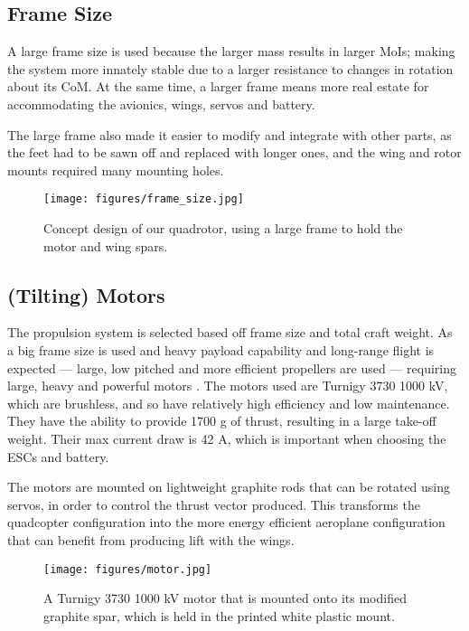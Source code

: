 \subsection*{Frame Size} 
A large frame size is used because the larger mass results in larger \acp{MoI}; making the system more innately stable due to a larger resistance to changes in rotation about its \ac{CoM}. At the same time, a larger frame means more real estate for accommodating the avionics, wings, servos and battery.

The large frame also made it easier to modify and integrate with other parts, as the feet had to be sawn off and replaced with longer ones, and the wing and rotor mounts required many mounting holes.

\begin{figure}[htpb!]
    \centering
    \texttt{[image: figures/frame\_size.jpg]}
    \caption{Concept design of our quadrotor, using a large frame to hold the motor and wing spars.}
    \label{fig:frame_size}
\end{figure}



\subsection*{(Tilting) Motors}
The propulsion system is selected based off frame size and total craft weight. As a big frame size is used and heavy payload capability and long-range flight is expected --- large, low pitched and more efficient propellers are used --- requiring large, heavy and powerful motors \cite{bershadsky+2016choosing_propulsion}. The motors used are Turnigy 3730 1000 \si{\kilo\volt}, which are brushless, and so have relatively high efficiency and low maintenance. They have the ability to provide 1700 \si{\gram} of thrust, resulting in a large take-off weight. Their max current draw is 42 \si{\ampere}, which is important when choosing the \acp{ESC} and battery. 

The motors are mounted on lightweight graphite rods that can be rotated using servos, in order to control the thrust vector produced. This transforms the quadcopter configuration into the more energy efficient aeroplane configuration that can benefit from producing lift with the wings.

\begin{figure}[htpb!]
    \centering
    \texttt{[image: figures/motor.jpg]}
    \caption{A Turnigy 3730 1000 \si{\kilo\volt} motor that is mounted onto its modified graphite spar, which is held in the printed white plastic mount.}
    \label{fig:motor}
\end{figure}


